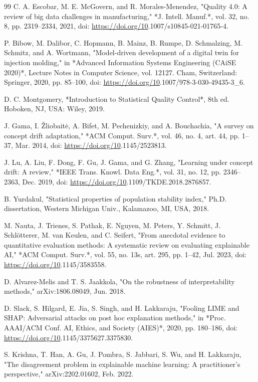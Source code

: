 \begin{thebibliography}{99}
 C. A. Escobar, M. E. McGovern, and R. Morales-Menendez, "Quality 4.0: A review of big data challenges in manufacturing," *J. Intell. Manuf.*, vol. 32, no. 8, pp. 2319–2334, 2021, doi: \url{https://doi.org/10}.1007/s10845-021-01765-4.

 P. Bibow, M. Dalibor, C. Hopmann, B. Mainz, B. Rumpe, D. Schmalzing, M. Schmitz, and A. Wortmann, "Model-driven development of a digital twin for injection molding," in *Advanced Information Systems Engineering (CAiSE 2020)*, Lecture Notes in Computer Science, vol. 12127. Cham, Switzerland: Springer, 2020, pp. 85–100, doi: \url{https://doi.org/10}.1007/978-3-030-49435-3\_6.

 D. C. Montgomery, *Introduction to Statistical Quality Control*, 8th ed. Hoboken, NJ, USA: Wiley, 2019.

 J. Gama, I. Žliobaitė, A. Bifet, M. Pechenizkiy, and A. Bouchachia, "A survey on concept drift adaptation," *ACM Comput. Surv.*, vol. 46, no. 4, art. 44, pp. 1–37, Mar. 2014, doi: \url{https://doi.org/10}.1145/2523813.

 J. Lu, A. Liu, F. Dong, F. Gu, J. Gama, and G. Zhang, "Learning under concept drift: A review," *IEEE Trans. Knowl. Data Eng.*, vol. 31, no. 12, pp. 2346–2363, Dec. 2019, doi: \url{https://doi.org/10}.1109/TKDE.2018.2876857.

 B. Yurdakul, "Statistical properties of population stability index," Ph.D. dissertation, Western Michigan Univ., Kalamazoo, MI, USA, 2018.

 M. Nauta, J. Trienes, S. Pathak, E. Nguyen, M. Peters, Y. Schmitt, J. Schlötterer, M. van Keulen, and C. Seifert, "From anecdotal evidence to quantitative evaluation methods: A systematic review on evaluating explainable AI," *ACM Comput. Surv.*, vol. 55, no. 13s, art. 295, pp. 1–42, Jul. 2023, doi: \url{https://doi.org/10}.1145/3583558.

 D. Alvarez-Melis and T. S. Jaakkola, "On the robustness of interpretability methods," arXiv:1806.08049, Jun. 2018.

 D. Slack, S. Hilgard, E. Jia, S. Singh, and H. Lakkaraju, "Fooling LIME and SHAP: Adversarial attacks on post hoc explanation methods," in *Proc. AAAI/ACM Conf. AI, Ethics, and Society (AIES)*, 2020, pp. 180–186, doi: \url{https://doi.org/10}.1145/3375627.3375830.

 S. Krishna, T. Han, A. Gu, J. Pombra, S. Jabbari, S. Wu, and H. Lakkaraju, "The disagreement problem in explainable machine learning: A practitioner's perspective," arXiv:2202.01602, Feb. 2022.


\end{thebibliography}
